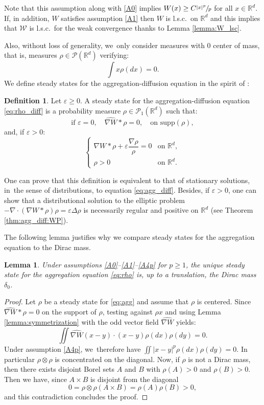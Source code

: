 \documentclass[11pt]{article}
\numberwithin{equation}{section}
\def\RR{\mathbb{R}}
\def\eps{\varepsilon}
\def\calP{{\mathcal P}}
\def\calW{{\mathcal W}}
\def\nabWchapo{\widehat{\nabla W}}
\theoremstyle{plain}
\newtheorem{lemma}[theorem]{Lemma}
\theoremstyle{definition}
\newtheorem{defi}[theorem]{Definition}
\begin{document}
Note that this assumption along with \eqref{A0} implies $W(x) \geq C \sfrac{|x|^p}{p}$ for all $x \in \RR^d$. If, in addition, $W$ satisfies assumption \eqref{A1} then $W$ is l.s.c.\ on $\RR^d$ and this implies that $\calW$ is l.s.c.\ for the weak convergence thanks to Lemma \ref{lemma:W_lsc}.

Also, without loss of generality, we~only consider measures with 0 center of mass, that is, measures $\rho \in \calP(\RR^d)$ verifying:
\[
\int x\rho (dx) = 0.
\]
We define steady states for the aggregation-diffusion equation in the spirit of \cite{kang19}:
\begin{defi}
Let $\eps \geq 0$. A steady state for the aggregation-diffusion equation \eqref{eq:rho_diff} is a probability measure $\rho \in \calP_1(\RR^d)$ such that:
\[
\text{if } \eps = 0, \quad \nabWchapo * \rho = 0, \quad \text{on } \mathrm{supp}(\rho),
\]
and, if $\eps > 0$:
\[
\begin{cases}
\nabla W * \rho + \eps \dfrac{\nabla \rho}{\rho} = 0 &\text{on } \RR^d,\\
\rho > 0&\text{on } \RR^d.
\end{cases}
\]
\end{defi}
One can prove that this definition is equivalent to that of stationary solutions, in~the sense of distributions, to equation \eqref{eq:agg_diff}. Besides, if $\eps > 0$, one can show that a distributional solution to the elliptic problem $- \nabla \cdot (\nabla W * \rho) \rho = \eps \Delta \rho$ is necessarily regular and positive on $\RR^d$ (see Theorem \ref{thm:agg_diff:WP}).

The following lemma justifies why we compare steady states for the aggregation equation to the Dirac mass.
\begin{lemma}
Under assumptions \eqref{A0}--\eqref{A1}--\eqref{A4p} for $p \geq 1$, the unique steady state for the aggregation equation \eqref{eq:rho} is, up to a translation, the Dirac mass $\delta_0$.
\end{lemma}

\begin{proof}
Let $\rho$ be a steady state for \eqref{eq:agg} and assume that $\rho$ is centered. Since $\nabWchapo * \rho = 0$ on the support of $\rho$, testing against $\rho x$ and using Lemma \ref{lemma:symmetrization} with the odd vector field $\nabWchapo$ yields:
\[
\iint \nabWchapo(x-y) \cdot (x-y) \rho(dx) \rho(dy) = 0.
\]
Under assumption \eqref{A4p}, we~therefore have $\iint |x-y|^p \rho(dx) \rho(dy) = 0$. In particular $\rho\otimes\rho$ is concentrated on the diagonal. Now, if $\rho$ is not a Dirac mass, then there exists disjoint Borel sets $A$ and $B$ with $\rho(A)>0$ and $\rho(B)>0$. Then we have, since $A\times B$ is disjoint from the diagonal
\[
0 =\rho \otimes \rho(A \times B) =\rho(A)\rho(B)> 0,
\]
and this contradiction concludes the proof.
\end{proof}
\end{document}
